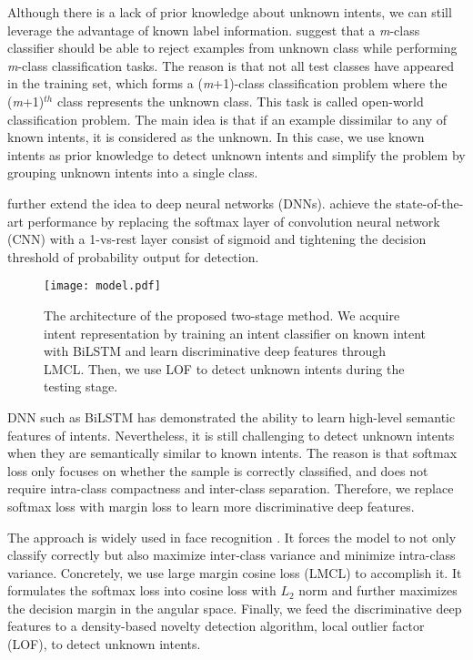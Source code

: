 \documentclass[11pt,a4paper]{article}
\begin{document}
Although there is a lack of prior knowledge about unknown intents, we can still leverage the advantage of known label information. \citet{Scheirer2013TowardOS,Fei2016BreakingTC} suggest that a \emph{m}-class classifier should be able to reject examples from unknown class while performing \emph{m}-class classification tasks. The reason is that not all test classes have appeared in the training set, which forms a (\emph{m}+1)-class classification problem where the (\emph{m}+1)$^{th}$ class represents the unknown class. This task is called open-world classification problem. The main idea is that if an example dissimilar to any of known intents, it is considered as the unknown. In this case, we use known intents as prior knowledge to detect unknown intents and simplify the problem by grouping unknown intents into a single class.

\citet{Bendale2016TowardsOS} further extend the idea to deep neural networks (DNNs). \citet{Shu2017DOCDO} achieve the state-of-the-art performance by replacing the softmax layer of convolution neural network (CNN) with a 1-vs-rest layer consist of sigmoid and tightening the decision threshold of probability output for detection.
\begin{figure*}[t]
  \centering
  \texttt{[image: model.pdf]}
  \caption{The architecture of the proposed two-stage method. We acquire intent representation by training an intent classifier on known intent with BiLSTM and learn discriminative deep features through LMCL. Then, we use LOF to detect unknown intents during the testing stage. \label{model}}
\end{figure*}

DNN such as BiLSTM \cite{Goo2018SlotGatedMF, Wang2018ABB} has demonstrated the ability to learn high-level semantic features of intents. Nevertheless, it is still challenging to detect unknown intents when they are semantically similar to known intents. The reason is that softmax loss only focuses on whether the sample is correctly classified, and does not require intra-class compactness and inter-class separation. Therefore, we replace softmax loss with margin loss to learn more discriminative deep features. 

The approach is widely used in face recognition \cite{DBLP:conf/icml/LiuWYY16, DBLP:conf/cvpr/LiuWYLRS17, DBLP:journals/corr/RanjanCC17}. It forces the model to not only classify correctly but also maximize inter-class variance and minimize intra-class variance. Concretely, we use large margin cosine loss (LMCL) \cite{DBLP:conf/cvpr/WangWZJGZL018} to accomplish it. It formulates the softmax loss into cosine loss with $L_2$ norm and further maximizes the decision margin in the angular space. Finally, we feed the discriminative deep features to a density-based novelty detection algorithm, local outlier factor (LOF), to detect unknown intents.
\end{document}
